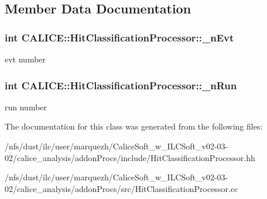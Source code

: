 \subsection{Member Data Documentation}
\subsubsection[{\-\_\-n\-Evt}]{\setlength{\rightskip}{0pt plus 5cm}int C\-A\-L\-I\-C\-E\-::\-Hit\-Classification\-Processor\-::\-\_\-n\-Evt\hspace{0.3cm}{\ttfamily [protected]}}\label{classCALICE_1_1HitClassificationProcessor_a425a88c89bb0546481dd56f01665a798}
evt number 
\subsubsection[{\-\_\-n\-Run}]{\setlength{\rightskip}{0pt plus 5cm}int C\-A\-L\-I\-C\-E\-::\-Hit\-Classification\-Processor\-::\-\_\-n\-Run\hspace{0.3cm}{\ttfamily [protected]}}\label{classCALICE_1_1HitClassificationProcessor_afa543d42f857d926cdcb12055738f82a}
run number 

The documentation for this class was generated from the following files\-:\begin{DoxyCompactItemize}
\item 
/nfs/dust/ilc/user/marquezh/\-Calice\-Soft\-\_\-w\-\_\-\-I\-L\-C\-Soft\-\_\-v02-\/03-\/02/calice\-\_\-analysis/addon\-Procs/include/Hit\-Classification\-Processor.\-hh\item 
/nfs/dust/ilc/user/marquezh/\-Calice\-Soft\-\_\-w\-\_\-\-I\-L\-C\-Soft\-\_\-v02-\/03-\/02/calice\-\_\-analysis/addon\-Procs/src/Hit\-Classification\-Processor.\-cc\end{DoxyCompactItemize}
